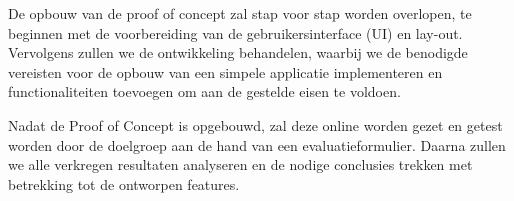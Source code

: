 De opbouw van de proof of concept zal stap voor stap worden overlopen, te beginnen met de voorbereiding van de gebruikersinterface (UI) en lay-out.  \newline
Vervolgens zullen we de ontwikkeling behandelen, waarbij we de benodigde vereisten voor de opbouw van een simpele applicatie implementeren en functionaliteiten toevoegen om aan de gestelde eisen te voldoen. \newline

Nadat de Proof of Concept is opgebouwd, zal deze online worden gezet en getest worden door de doelgroep aan de hand van een evaluatieformulier. \newline
Daarna zullen we alle verkregen resultaten analyseren en de nodige conclusies trekken met betrekking tot de ontworpen features.

